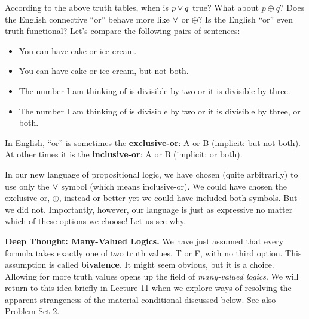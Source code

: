 \documentclass[options]{philosophersimprint}
\theoremstyle{definition}
\begin{document}
According to the above truth tables, when is $p \mathbin{\vee} q$ true? What about $p \oplus q$? Does the English connective ``or'' behave more like $\mathbin{\vee}$ or $\oplus$? Is the English ``or'' even truth-functional? Let's compare the following pairs of sentences:
\begin{itemize}
    \item[1a.] You can have cake or ice cream.
    \item[1b.] You can have cake or ice cream, but not both.
    \item[2a.] The number I am thinking of is divisible by two or it is divisible by three.
    \item[2b.] The number I am thinking of is divisible by two or it is divisible by three, or both.
\end{itemize}
In English, ``or'' is sometimes the \textbf{exclusive-or}: A or B (implicit: but not both). At other times it is the \textbf{inclusive-or}: A or B (implicit: or both).

In our new language of propositional logic, we have chosen (quite arbitrarily) to use only the $\mathbin{\vee}$ symbol (which means inclusive-or). We could have chosen the exclusive-or, $\oplus$, instead or better yet we could have included both symbols. But we did not. Importantly, however, our language is just as expressive no matter which of these options we choose! Let us see why.
\begin{framed}
\noindent\textbf{Deep Thought: Many-Valued Logics.}
We have just assumed that every formula takes exactly one of two truth values, T or F, with no third option. This assumption is called \textbf{bivalence}. It might seem obvious, but it is a choice. Allowing for more truth values opens up the field of \textit{many-valued logics}. We will return to this idea briefly in Lecture 11 when we explore ways of resolving the apparent strangeness of the material conditional discussed below. See also Problem Set 2.
\end{framed}
\end{document}
